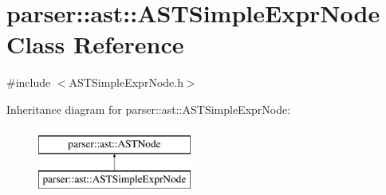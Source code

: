 \hypertarget{classparser_1_1ast_1_1ASTSimpleExprNode}{}\section{parser\+:\+:ast\+:\+:A\+S\+T\+Simple\+Expr\+Node Class Reference}
\label{classparser_1_1ast_1_1ASTSimpleExprNode}


{\ttfamily \#include $<$A\+S\+T\+Simple\+Expr\+Node.\+h$>$}

Inheritance diagram for parser\+:\+:ast\+:\+:A\+S\+T\+Simple\+Expr\+Node\+:\begin{figure}[H]
\begin{center}
\leavevmode
\includegraphics[height=2.000000cm]{d7/d5d/classparser_1_1ast_1_1ASTSimpleExprNode}
\end{center}
\end{figure}

